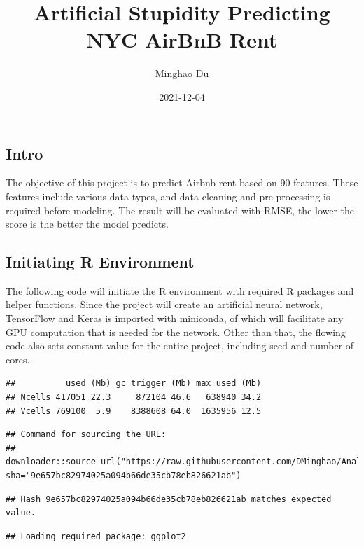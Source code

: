 \documentclass[
]{article}
\title{Artificial Stupidity Predicting NYC AirBnB Rent}
\author{Minghao Du}
\date{2021-12-04}
\begin{document}
\maketitle

\hypertarget{intro}{%
\subsection{Intro}\label{intro}}

The objective of this project is to predict Airbnb rent based on 90
features. These features include various data types, and data cleaning
and pre-processing is required before modeling. The result will be
evaluated with RMSE, the lower the score is the better the model
predicts.

\hypertarget{initiating-r-environment}{%
\subsection{Initiating R Environment}\label{initiating-r-environment}}

The following code will initiate the R environment with required R
packages and helper functions. Since the project will create an
artificial neural network, TensorFlow and Keras is imported with
miniconda, of which will facilitate any GPU computation that is needed
for the network. Other than that, the flowing code also sets constant
value for the entire project, including seed and number of cores.

\begin{verbatim}
##          used (Mb) gc trigger (Mb) max used (Mb)
## Ncells 417051 22.3     872104 46.6   638940 34.2
## Vcells 769100  5.9    8388608 64.0  1635956 12.5
\end{verbatim}

\begin{verbatim}
## Command for sourcing the URL:
##   downloader::source_url("https://raw.githubusercontent.com/DMinghao/Analysis_Pocketknife/main/R/init_env.R", sha="9e657bc82974025a094b66de35cb78eb826621ab")
\end{verbatim}

\begin{verbatim}
## Hash 9e657bc82974025a094b66de35cb78eb826621ab matches expected value.
\end{verbatim}

\begin{verbatim}
## Loading required package: ggplot2
\end{verbatim}
\end{document}
